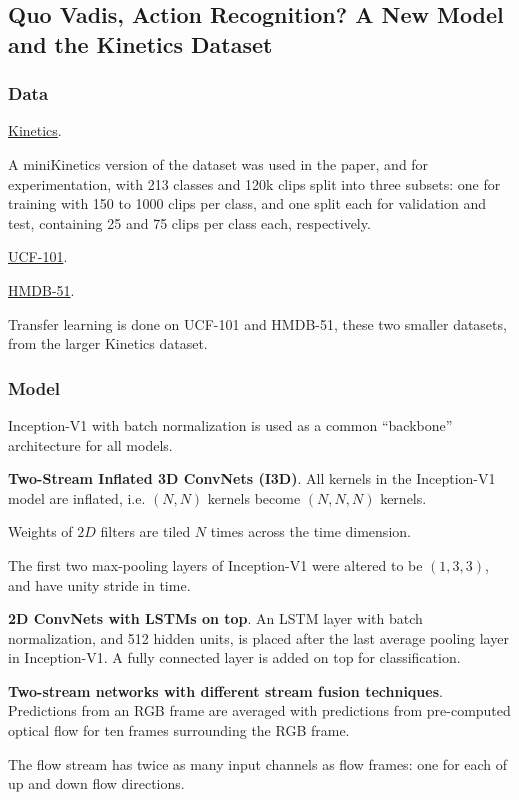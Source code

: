 \documentclass[a4paper, 12pt]{article}
\begin{document}
\subsection{Quo Vadis, Action Recognition? A New Model and the Kinetics
            Dataset\citet{carreira2017quo}}

\subsubsection{Data}

\hyperref[kinetics]{Kinetics}.

A miniKinetics version of the dataset was used in the paper, and for
experimentation, with 213 classes and 120k clips split into three subsets: one
for training with 150 to 1000 clips per class, and one split each for
validation and test, containing 25 and 75 clips per class each, respectively.

\hyperref[ucf101]{UCF-101}.

\hyperref[hmdb51]{HMDB-51}.

Transfer learning is done on UCF-101 and HMDB-51, these two smaller datasets,
from the larger Kinetics dataset.

\subsubsection{Model}

Inception-V1 with batch normalization is used as a common ``backbone''
architecture for all models.

\textbf{Two-Stream Inflated 3D ConvNets (I3D)}. All kernels in the Inception-V1
model are inflated, i.e. $(N, N)$ kernels become $(N, N, N)$ kernels.

Weights of $2D$ filters are tiled $N$ times across the time dimension.

The first two max-pooling layers of Inception-V1 were altered to be
$(1, 3, 3)$, and have unity stride in time.

\textbf{2D ConvNets with LSTMs on top}. An LSTM layer with batch normalization,
and 512 hidden units, is placed after the last average pooling layer in
Inception-V1. A fully connected layer is added on top for classification.

\textbf{Two-stream networks with different stream fusion techniques}.
Predictions from an RGB frame are averaged with predictions from pre-computed
optical flow for ten frames surrounding the RGB frame.

The flow stream has twice as many input channels as flow frames: one for each
of up and down flow directions.
\end{document}
